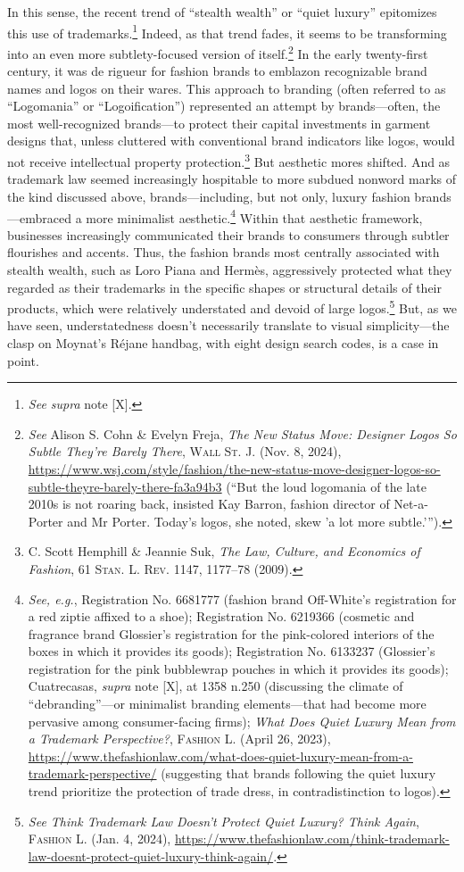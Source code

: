 \documentclass[letterpaper, 11pt, oneside]{article}
\begin{document}
In this sense, the recent trend of ``stealth wealth'' or ``quiet luxury'' epitomizes this use of trademarks.\footnote{\textit{See supra} note [X].} Indeed, as that trend fades, it seems to be transforming into an even more subtlety-focused version of itself.\footnote{\textit{See} Alison S. Cohn \& Evelyn Freja, \textit{The New Status Move: Designer Logos So Subtle They’re Barely There}, \textsc{Wall St. J.} (Nov. 8, 2024), \url{https://www.wsj.com/style/fashion/the-new-status-move-designer-logos-so-subtle-theyre-barely-there-fa3a94b3} (``But the loud logomania of the late 2010s is not roaring back, insisted Kay Barron, fashion director of Net-a-Porter and Mr Porter. Today's logos, she noted, skew 'a lot more subtle.'\thinspace'').} In the early twenty-first century, it was de rigueur for fashion brands to emblazon recognizable brand names and logos on their wares. This approach to branding (often referred to as ``Logomania'' or ``Logoification'') represented an attempt by brands—often, the most well-recognized brands—to protect their capital investments in garment designs that, unless cluttered with conventional brand indicators like logos, would not receive intellectual property protection.\footnote{C. Scott Hemphill \& Jeannie Suk, \textit{The Law, Culture, and Economics of Fashion}, 61 \textsc{Stan. L. Rev.} 1147, 1177–78  (2009).} But aesthetic mores shifted. And as trademark law seemed increasingly hospitable to more subdued nonword marks of the kind discussed above, brands—including, but not only, luxury fashion brands—embraced a more minimalist aesthetic.\footnote{\textit{See, e.g.}, Registration No. 6681777 (fashion brand Off-White's registration for a red ziptie affixed to a shoe); Registration No. 6219366 (cosmetic and fragrance brand Glossier's registration for the pink-colored interiors of the boxes in which it provides its goods); Registration No. 6133237 (Glossier's registration for the pink bubblewrap pouches in which it provides its goods); Cuatrecasas, \textit{supra} note [X], at 1358 n.250 (discussing the climate of ``debranding''—or minimalist branding elements—that had become more pervasive among consumer-facing firms); \textit{What Does Quiet Luxury Mean from a Trademark Perspective?}, \textsc{Fashion L.} (April 26, 2023), \url{https://www.thefashionlaw.com/what-does-quiet-luxury-mean-from-a-trademark-perspective/} (suggesting that brands following the quiet luxury trend prioritize the protection of trade dress, in contradistinction to logos).} Within that aesthetic framework, businesses increasingly communicated their brands to consumers through subtler flourishes and accents. Thus, the fashion brands most centrally associated with stealth wealth, such as Loro Piana and Hermès, aggressively protected what they regarded as their trademarks in the specific shapes or structural details of their products, which were relatively understated and devoid of large logos.\footnote{\textit{See Think Trademark Law Doesn’t Protect Quiet Luxury? Think Again}, \textsc{Fashion L.} (Jan. 4, 2024), \url{https://www.thefashionlaw.com/think-trademark-law-doesnt-protect-quiet-luxury-think-again/}.} But, as we have seen, understatedness doesn't necessarily translate to visual simplicity—the clasp on Moynat's Réjane handbag, with eight design search codes, is a case in point. 
\end{document}
